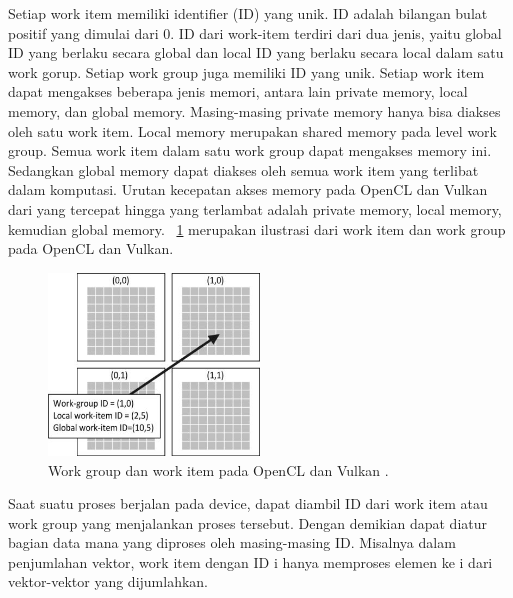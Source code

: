 Setiap work item memiliki identifier (ID) yang unik. ID adalah bilangan bulat positif yang dimulai dari 0. ID dari work-item terdiri dari dua jenis, yaitu global ID yang berlaku secara global dan local ID yang berlaku secara local dalam satu work gorup. Setiap work group juga memiliki ID yang unik. Setiap work item dapat mengakses beberapa jenis memori, antara lain private memory, local memory, dan global memory. Masing-masing private memory hanya bisa diakses oleh satu work item. Local memory merupakan shared memory pada level work group. Semua work item dalam satu work group dapat mengakses memory ini. Sedangkan global memory dapat diakses oleh semua work item yang terlibat dalam komputasi. Urutan kecepatan akses memory pada OpenCL dan Vulkan dari yang tercepat hingga yang terlambat adalah private memory, local memory, kemudian global memory. \pic~\ref{fig:work} merupakan ilustrasi dari work item dan work group pada OpenCL dan Vulkan.

\begin{figure}
	\centering
	\includegraphics[width=0.50\textwidth]
	{pics/opencl-work.jpg}
	\caption{Work group dan work item pada OpenCL dan Vulkan .}
	\label{fig:work}
\end{figure}

Saat suatu proses berjalan pada device, dapat diambil ID dari work item atau work group yang menjalankan proses tersebut. Dengan demikian dapat diatur bagian data mana yang diproses oleh masing-masing ID. Misalnya dalam penjumlahan vektor, work item dengan ID i hanya memproses elemen ke i dari vektor-vektor yang dijumlahkan.